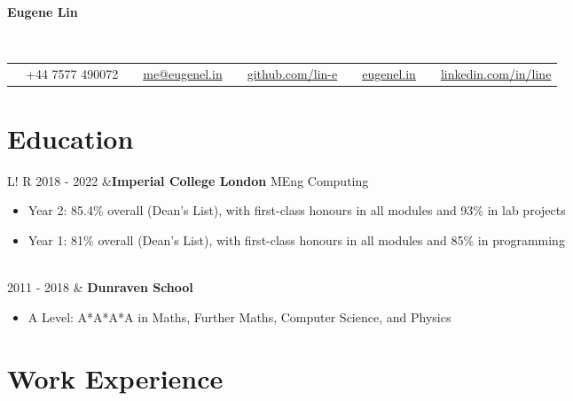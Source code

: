 \documentclass[10pt, a4paper]{article}
\newcommand\vsep{\color{lightgray} \vrule width 0.5pt}
\newcommand\sect[1]{\section*{\hspace{.05cm} \Large\sc #1}}
\newcommand\itemizespace{\vspace{-0.65\baselineskip}}
\newcommand\finishsectionspace{\vspace{-1.1\baselineskip}}
\newcommand\tspace{\hfill}
\begin{document}
        \
        \begin{center}
            \vspace{-2.5\baselineskip}
            \bfseries\huge\sc Eugene Lin
        \end{center}
        \vspace{-0.5\baselineskip}
        \ \begin{tabular*}{0.99\textwidth}{@{\extracolsep{\fill}} ccccc}
            \faPhone \ \ +44 7577 490072 &
            \faEnvelope \ \ \href{mailto:me@eugenel.in}{me@eugenel.in} &
            \faGithub \ \ \href{https://github.com/lin-e/}{github.com/lin-e} &
            \faGlobe \ \ \href{https://eugenel.in/}{eugenel.in} &
            \faLinkedinSquare \ \ \href{https://www.linkedin.com/in/line/}{linkedin.com/in/line}
        \end{tabular*}
        \sect{Education}
            \begin{tabular}{L!{\vsep}R}
                2018 - 2022 &\textbf{Imperial College London} \tspace MEng Computing
                    \begin{itemize}[label=\raisebox{0.25ex}{\tiny$\bullet$}]
                        \setlength{\itemindent}{-0.125in}
                        \item Year 2: 85.4\% overall (Dean's List), with first-class honours in all modules and 93\% in lab projects
                        \item Year 1: 81\% overall (Dean's List), with first-class honours in all modules and 85\% in programming
                        \itemizespace
                    \end{itemize} \\
                2011 - 2018 & \textbf{Dunraven School}
                    \begin{itemize}[label=\raisebox{0.25ex}{\tiny$\bullet$}]
                        \setlength{\itemindent}{-0.125in}
                        \item A Level: A*A*A*A in Maths, Further Maths, Computer Science, and Physics
                        \finishsectionspace
                    \end{itemize}
            \end{tabular}
        \sect{Work Experience}
\end{document}

